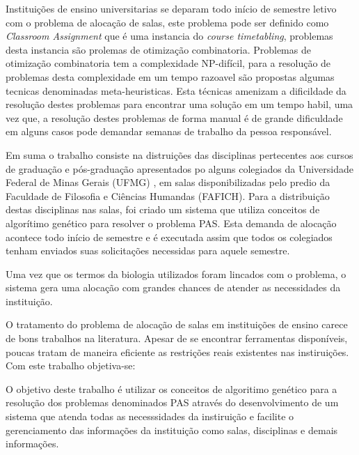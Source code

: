 \sumario
{}


Instituições de ensino universitarias se deparam todo início de semestre letivo com o problema de alocação de salas, este problema pode ser definido como \textit{Classroom Assignment} que é uma instancia do \textit{course timetabling}, problemas desta instancia são prolemas de otimização combinatoria. Problemas de otimização combinatoria tem a complexidade NP-difícil, para a resolução de problemas desta complexidade em um tempo razoavel são propostas algumas tecnicas denominadas meta-heuristicas. Esta técnicas amenizam a dificildade da resolução destes problemas para encontrar uma solução em um tempo habil, uma vez que, a resolução destes problemas de forma manual é de grande dificuldade em alguns casos pode demandar semanas de trabalho da pessoa responsável.\par


Em suma o trabalho consiste na distruições das disciplinas pertecentes aos cursos de graduação e pós-graduação apresentados po alguns  colegiados da Universidade Federal de Minas Gerais (UFMG) , em salas disponibilizadas pelo predio da Faculdade de Filosofia e Ciências Humandas (FAFICH). Para a distribuição destas disciplinas nas salas, foi criado um sistema que utiliza conceitos de algorítimo genético para resolver o problema PAS. Esta demanda de alocação acontece todo início de semestre e é executada assim que todos os colegiados tenham enviados suas solicitações necessidas para aquele semestre.\par

Uma vez que os termos da biologia utilizados foram lincados com o problema, o sistema gera uma alocação com grandes chances de atender as necessidades da instituição. \par


O tratamento do problema de alocação de salas em instituições de ensino carece de bons trabalhos na literatura. Apesar de se encontrar ferramentas disponíveis, poucas tratam de maneira eficiente as restrições reais existentes nas instiruições. Com este trabalho objetiva-se:


O objetivo deste trabalho é utilizar os conceitos de algoritimo genético para a resolução dos problemas denominados PAS através do desenvolvimento de um sistema que atenda todas as necesssidades da instiruição e facilite o gerenciamento das informações da instituição como salas, disciplinas e demais informações.

